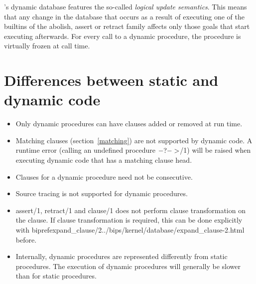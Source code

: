 {\eclipse}'s dynamic database features the so-called {\it logical update semantics}.
This means that any change in the database that occurs as a result of
executing one of the builtins of the abolish, assert or retract family
affects only those goals that start executing
afterwards. For every call to a dynamic procedure, the procedure is
virtually frozen at call time.

\section{Differences between static and dynamic code}

\begin{itemize}
\item Only dynamic procedures can have clauses added or removed at run time.
\item Matching clauses (section~\ref{matching}) are not supported by dynamic
  code. A runtime error (calling an undefined procedure $-?->$/1) will
  be raised when executing dynamic code that has a matching clause head.
\item Clauses for a dynamic procedure need not be consecutive.
\item Source tracing is not supported for dynamic procedures.
\item assert/1, retract/1 and clause/1 does not perform clause
  transformation on the clause. If clause transformation is required,
  this can be done explicitly with 
  bipref{expand_clause/2}{../bips/kernel/database/expand_clause-2.html}
  before.
\item Internally, dynamic procedures are represented differently from static
  procedures. The execution of dynamic procedures will generally be slower
  than for static procedures.
\end{itemize}
   

